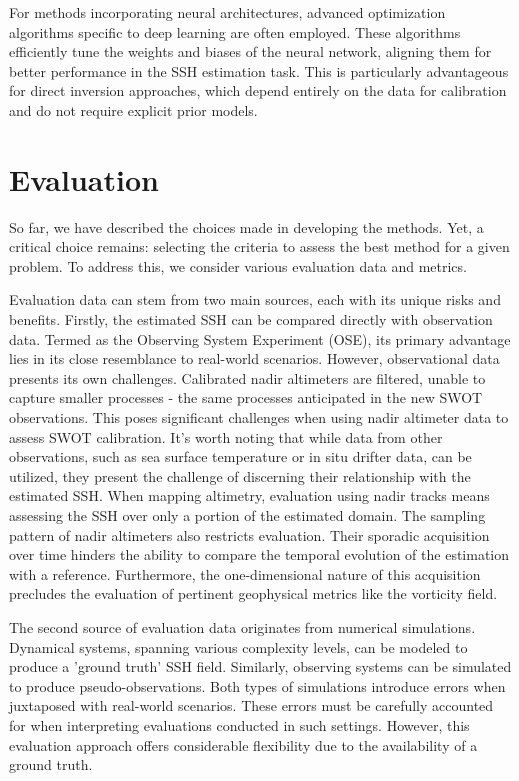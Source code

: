 \begin{bibunit}
For methods incorporating neural architectures, advanced optimization algorithms specific to deep learning are often employed. These algorithms efficiently tune the weights and biases of the neural network, aligning them for better performance in the SSH estimation task. This is particularly advantageous for direct inversion approaches, which depend entirely on the data for calibration and do not require explicit prior models.

\section{Evaluation}
So far, we have described the choices made in developing the methods. Yet, a critical choice remains: selecting the criteria to assess the best method for a given problem. To address this, we consider various evaluation data and metrics.

Evaluation data can stem from two main sources, each with its unique risks and benefits. Firstly, the estimated SSH can be compared directly with observation data. Termed as the Observing System Experiment (OSE), its primary advantage lies in its close resemblance to real-world scenarios. However, observational data presents its own challenges. Calibrated nadir altimeters are filtered, unable to capture smaller processes - the same processes anticipated in the new SWOT observations. This poses significant challenges when using nadir altimeter data to assess SWOT calibration. It's worth noting that while data from other observations, such as sea surface temperature or in situ drifter data, can be utilized, they present the challenge of discerning their relationship with the estimated SSH. When mapping altimetry, evaluation using nadir tracks means assessing the SSH over only a portion of the estimated domain. The sampling pattern of nadir altimeters also restricts evaluation. Their sporadic acquisition over time hinders the ability to compare the temporal evolution of the estimation with a reference. Furthermore, the one-dimensional nature of this acquisition precludes the evaluation of pertinent geophysical metrics like the vorticity field.

The second source of evaluation data originates from numerical simulations. Dynamical systems, spanning various complexity levels, can be modeled to produce a 'ground truth' SSH field. Similarly, observing systems can be simulated to produce pseudo-observations. Both types of simulations introduce errors when juxtaposed with real-world scenarios. These errors must be carefully accounted for when interpreting evaluations conducted in such settings. However, this evaluation approach offers considerable flexibility due to the availability of a ground truth.


\end{bibunit}
